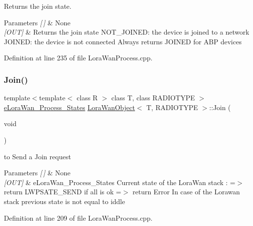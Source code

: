 Returns the join state. 


\begin{DoxyParams}{Parameters}
{\em \mbox{[}$\,$\mbox{]}} & None \\
\hline
{\em \mbox{[}\+O\+U\+T\mbox{]}} & Returns the join state N\+O\+T\+\_\+\+J\+O\+I\+N\+ED\+: the device is joined to a network J\+O\+I\+N\+ED\+: the device is not connected Always returns J\+O\+I\+N\+ED for A\+BP devices \\
\hline
\end{DoxyParams}


Definition at line 235 of file Lora\+Wan\+Process.\+cpp.

\mbox{\label{class_lora_wan_object_a4585cc16886b0dc622ce768184d2d5e0}} 
\subsubsection{\texorpdfstring{Join()}{Join()}}
{\footnotesize\ttfamily template$<$template$<$ class R $>$ class T, class R\+A\+D\+I\+O\+T\+Y\+PE $>$ \\
\mbox{\hyperlink{_define_8h_acabcd539e4bcc6575c90bd7d857b21f4}{e\+Lora\+Wan\+\_\+\+Process\+\_\+\+States}} \mbox{\hyperlink{class_lora_wan_object}{Lora\+Wan\+Object}}$<$ T, R\+A\+D\+I\+O\+T\+Y\+PE $>$\+::Join (\begin{DoxyParamCaption}\item[{void}]{ }\end{DoxyParamCaption})}



to Send a Join request 


\begin{DoxyParams}{Parameters}
{\em \mbox{[}$\,$\mbox{]}} & None \\
\hline
{\em \mbox{[}\+O\+U\+T\mbox{]}} & e\+Lora\+Wan\+\_\+\+Process\+\_\+\+States Current state of the Lora\+Wan stack \+: =$>$ return L\+W\+P\+S\+A\+T\+E\+\_\+\+S\+E\+ND if all is ok =$>$ return Error In case of the Lorawan stack previous state is not equal to iddle \\
\hline
\end{DoxyParams}


Definition at line 209 of file Lora\+Wan\+Process.\+cpp.

\mbox{\label{class_lora_wan_object_aa833aaa609033491d4b8566bc93851cf}} 
